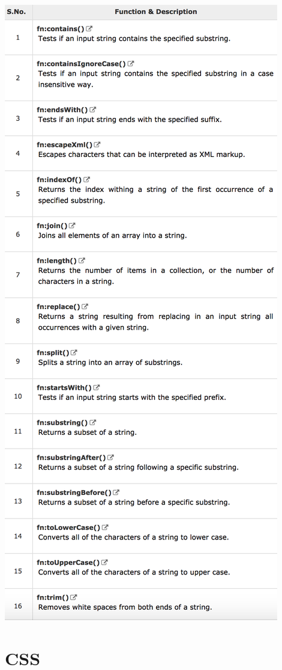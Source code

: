 \documentclass[11pt]{article}
\begin{document}
\begin{center}
	\includegraphics[width=0.7\linewidth]{JSTL_Functions}
\end{center}

	\section{CSS}
\end{document}

